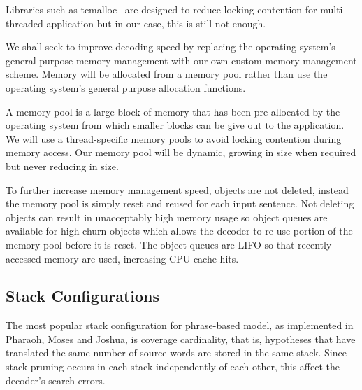 \documentclass[11pt]{article}
\begin{document}
Libraries such as tcmalloc~\cite{ghemawat2009tcmalloc} are designed to reduce locking contention for multi-threaded application but in our case, this is still not enough. 

We shall seek to improve decoding speed by replacing the operating system's general purpose memory management with our own custom memory management scheme. Memory will be allocated from a memory pool rather than use the operating system's general purpose allocation functions.

A memory pool is a large block of memory that has been pre-allocated by the operating system from which smaller blocks can be give out to the application. We will use a thread-specific memory pools to avoid locking contention during memory access. Our memory pool will be dynamic, growing in size when required but never reducing in size.

To further increase memory management speed, objects are not deleted, instead the memory pool is simply reset and reused for each input sentence. Not deleting objects can result in unacceptably high memory usage so object queues are available for high-churn objects which allows the decoder to re-use portion of the memory pool before it is reset. The object queues are LIFO so that recently accessed memory are used, increasing CPU cache hits.



\subsection{Stack Configurations}

The most popular stack configuration for phrase-based model, as implemented in Pharaoh, Moses and Joshua, is coverage cardinality, that is, hypotheses that have translated the same number of source words are stored in the same stack. Since stack pruning occurs in each stack independently of each other, this affect the decoder's search errors.
\end{document}
